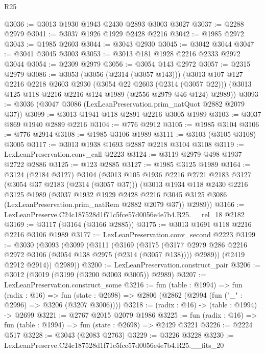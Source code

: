 \begin{lexlean}{R25}
\begin{coremodule}
@3036 := @3013 @1930 @1943 @2430 @2893 @3003 @3027
@3037 := @2288 @2979
@3041 := @3037 @1926 @1929 @2428 @2216
@3042 := @1985 @2972
@3043 := @1985 @2603
@3044 := @3043 @2930
@3045 := @3042 @3044
@3047 := @3041 @3045 @3003
@3053 := @3013 @181 @1928 @2216 @2333 @2972 @3044
@3054 := @2309 @2979
@3056 := @3054 @143 @2972
@3057 := @2315 @2979
@3086 := @3053
    (@3056 (@2314 (@3057 @143)))
    (@3013
      @107
      @127
      @2216
      @2218
      @2603
      @2930
      (@3054 @22 @2603 (@2314 (@3057 @22)))
      (@3013 @125 @118 @2216 @2216 @124 @1989 (@2556 @2979 @46 @124) @2989))
@3093 := @3036 (@3047 @3086 (LexLeanPreservation.prim_natQuot @2882 @2079 @37))
@3099 := @3013 @1941 @118 @2891 @2216 @3005 @1989
@3103 := @3037 @869 @1940 @2889 @2216
@3104 := @776 @2912
@3105 := @1985 @3104
@3106 := @776 @2914
@3108 := @1985 @3106 @1989
@3111 := @3103 (@3105 @3108) @3005
@3117 := @3013 @1938 @1693 @2887 @2218 @3104 @3108
@3119 := LexLeanPreservation.conv_call @2223
@3124 := @3119 @2979 @498 @1937 @2722 @2886
@3125 := @123 @2885
@3127 := @1985 @3125 @1989
@3164 := @3124
    (@2184 @3127)
    @3104
    (@3013
      @105
      @1936
      @2216
      @2721
      @2183
      @3127
      (@3054 @37 @2183 (@2314 (@3057 @37)))
      (@3013
        @1934
        @118
        @2430
        @2216
        @3125
        @1989
        (@3037
          @1932
          @1929
          @2428
          @2216
          @3045
          @3125
          @3086
          (LexLeanPreservation.prim_natRem @2882 @2079 @37))
        @2989))
@3166 := LexLeanPreserve.C24c187528d1f71c5fce57d0056e4e7b4.R25.__rel_18 @2182
@3169 := @3117 (@3164 (@3166 @2885))
@3175 := @3013 @1691 @118 @2216 @2216 @3106 @1989
@3177 := LexLeanPreservation.conv_second @2223
@3199 := @3030
    (@3093
      (@3099
        (@3111
          (@3169
            (@3175
              (@3177 @2979 @286 @2216 @2972 @3106 (@3054 @138 @2975 (@2314 (@3057 @138))))
              @2989))
          (@2419 @2912 @2914))
        @2989))
@3200 := LexLeanPreservation.construct_pair
@3206 := @3012 (@3019 (@3199 (@3200 @3003 @3005)) @2989)
@3207 := LexLeanPreservation.construct_some
@3216 := fun (table : @1994) =>
  fun (radix : @16) =>
  fun (state : @2698) => @2806 (@2862 (@2994 (fun ("_" : @2996) => @3206 (@3207 @3006))))
@3218 := (radix : @16) -> (table : @1994) -> @2699
@3221 := @2767 @2015 @2079 @1986
@3225 := fun (radix : @16) => fun (table : @1994) => fun (state : @2698) => @2429 @3221
@3226 := @2224 @517
@3228 := @3043 (@2083 @2763)
@3229 := @3226 @3228
@3230 := LexLeanPreserve.C24c187528d1f71c5fce57d0056e4e7b4.R25.__fits_20

\end{coremodule}
\end{lexlean}
